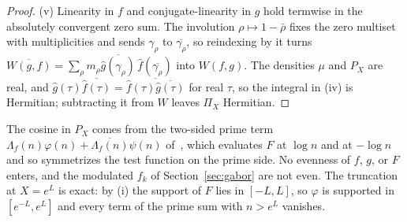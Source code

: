 \documentclass[11pt]{article}
\theoremstyle{definition}
\begin{document}
\begin{proof}
(v) Linearity in $f$ and conjugate-linearity in $g$ hold termwise in the
absolutely convergent zero sum. The involution $\rho\mapsto1-\bar\rho$ fixes the
zero multiset with multiplicities and sends $\gamma_\rho$ to
$\overline{\gamma_\rho}$, so reindexing by it turns
$\overline{W(g,f)}=\sum_\rho m_\rho\overline{\widehat g(\gamma_\rho)}\,\widehat f(\overline{\gamma_\rho})$
into $W(f,g)$. The densities $\mu$ and $P_X$ are real, and
$\widehat g(\tau)\overline{\widehat f(\tau)}=\overline{\widehat f(\tau)\overline{\widehat g(\tau)}}$
for real $\tau$, so the integral in (iv) is Hermitian; subtracting it from $W$
leaves $\Pi_X$ Hermitian.
\end{proof}

The cosine in $P_X$ comes from the two-sided prime term
$\Lambda_f(n)\varphi(n)+\overline{\Lambda_f(n)}\psi(n)$ of~\cite[(5.44)]{IK04}, which evaluates
$F$ at $\log n$ and at $-\log n$ and so symmetrizes the test function on the
prime side. No evenness of $f$, $g$, or $F$ enters, and the modulated $f_k$ of Section~\ref{sec:gabor}
are not even. The truncation at $X=e^{L}$ is exact: by (i) the support of $F$ lies
in $[-L,L]$, so $\varphi$ is supported in $[e^{-L},e^{L}]$ and every term of the
prime sum with $n>e^{L}$ vanishes.
\end{document}
